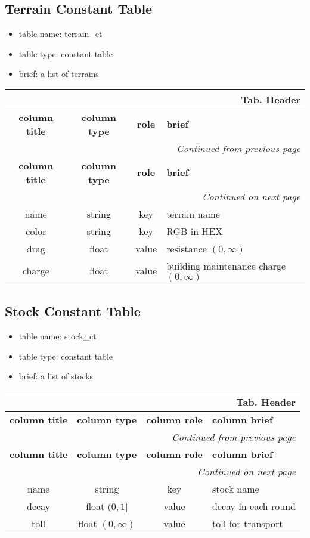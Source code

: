 \documentclass[a4paper,oneside,titlepage]{report}
\newcommand*{\LTHeaderIV}[5]{
  \multicolumn{4}{r}{\textbf{Tab. \thesubsection} \textbf{#1}}\\    
  \hline
  \textbf{#2} & \textbf{#3} & \textbf{#4} & \textbf{#5}\\
  \hline
  
  \endfirsthead
  \multicolumn{4}{r}{\textit{Continued from previous page}}\\    
  \hline
  \textbf{#2} & \textbf{#3} & \textbf{#4} & \textbf{#5}\\
  \hline
  \endhead
  \hline
  \multicolumn{4}{r}{\textit{Continued on next page}}\\
  \endfoot
  \hline
  \endlastfoot  
}
\begin{document}
\subsection{Terrain Constant Table}
\begin{itemize}
  \setlength{\itemsep}{0pt}
  \setlength{\parskip}{0pt}
\item table name: terrain\_ct  
\item table type: constant table   
\item brief: a list of terrains
\end{itemize}

\vspace{-0.5cm}
\begin{longtable}{ |c|c|c|l| } 
  \LTHeaderIV{Header}{column title}{column type}{role}{brief}                    
  name & string & key & terrain name\\
  color & string  & key & RGB in HEX\\
  drag & float & value & resistance $(0, \infty)$\\
  charge & float & value & building maintenance charge $(0, \infty)$\\
\end{longtable}        

\subsection{Stock Constant Table}
\begin{itemize}
  \setlength{\itemsep}{0pt}
  \setlength{\parskip}{0pt}
\item table name: stock\_ct  
\item table type: constant table   
\item brief: a list of stocks
\end{itemize}

\vspace{-0.5cm}
\begin{longtable}{ |c|c|c|l| } 
  \LTHeaderIV{Header}{column title}{column type}{column role}{column brief} 
  name & string & key & stock name\\
  decay & float $(0, 1]$ & value & decay in each round\\
  toll & float $(0, \infty)$ & value & toll for transport\\
\end{longtable}        
\end{document}
